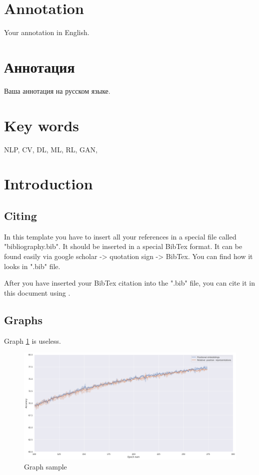 \documentclass[a4paper,14pt]{extarticle}
\begin{document}
\newpage

{
	\hypersetup{linkcolor=black}
	\tableofcontents
}

\newpage
\section*{Annotation} 

Your annotation in English.

\section*{\foreignlanguage{russian}{Аннотация}}   %
\foreignlanguage{russian}{
    Ваша аннотация на русском языке.
}

\section*{Key words}
NLP, CV, DL, ML, RL, GAN, 
\pagebreak

\section{Introduction}

\subsection{Citing}

In this template you have to insert all your references in a special file 
called "bibliography.bib". It should be inserted in a special BibTex format. 
It can be found easily via google scholar -> quotation sign -> BibTex. You can find how it looks in ".bib" file.

After you have inserted your BibTex citation into the ".bib" file, you can cite it in this document using \cite{vaswani2017}.

\subsection{Graphs}

Graph \ref{fig:by_epochs} is useless.

\begin{figure}[h!]
	\centering
	\includegraphics[width=1\textwidth]{graph2.png}
	\caption{Graph sample}
	\label{fig:by_epochs}
\end{figure}
\end{document}
